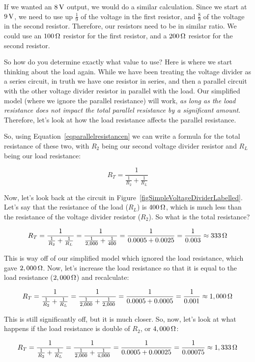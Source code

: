 If we wanted an $8\,\si{\volt}$ output, we would do a similar calculation.  
Since we start at $9\,\si{\volt}$, we need to use up $\frac{1}{9}$ of the voltage in the first resistor, and $\frac{8}{9}$ of the voltage in the second resistor.
Therefore, our resistors need to be in similar ratio.
We could use an $100\,\si{\ohm}$ resistor for the first resistor, and a $200\,\si{\ohm}$ resistor for the second resistor.

So how do you determine exactly what value to use?
Here is where we start thinking about the load again.
While we have been treating the voltage divider as a series circuit, in truth we have one resistor in series, and then a parallel circuit with the other voltage divider resistor in parallel with the load.
Our simplified model (where we ignore the parallel resistance) will work, \emph{as long as the load resistance does not impact the total parallel resistance by a significant amount}.
Therefore, let's look at how the load resistance affects the parallel resistance.

So, using Equation~\ref{eqparallelresistancen} we can write a formula for the total resistance of these two, with $R_2$ being our second voltage divider resistor and $R_L$ being our load resistance:

$$ R_T = \frac{1}{\frac{1}{R_2} + \frac{1}{R_L}} $$

Now, let's look back at the circuit in Figure~\ref{figSimpleVoltageDividerLabelled}.
Let's say that the resistance of the load ($R_L$) is $400\,\si{\ohm}$, which is much less than the resistance of the voltage divider resistor ($R_2$).
So what is the total resistance?

$$ R_T = \frac{1}{\frac{1}{R_2} + \frac{1}{R_L}} = \frac{1}{\frac{1}{2,000} + \frac{1}{400}} = \frac{1}{0.0005 + 0.0025} = \frac{1}{0.003} \approx 333\,\si{\ohm} $$

This is way off of our simplified model which ignored the load resistance, which gave $2,000\,\si{\ohm}$.
Now, let's increase the load resistance so that it is equal to the load resistance ($2,000\,\si{\ohm}$) and recalculate:

$$ R_T = \frac{1}{\frac{1}{R_2} + \frac{1}{R_L}} = \frac{1}{\frac{1}{2,000} + \frac{1}{2,000}} = \frac{1}{0.0005 + 0.0005} = \frac{1}{0.001} \approx 1,000\,\si{\ohm} $$

This is still significantly off, but it is much closer.
So, now, let's look at what happens if the load resistance is double of $R_2$, or $4,000\,\si{\ohm}$:

$$ R_T = \frac{1}{\frac{1}{R_2} + \frac{1}{R_L}} = \frac{1}{\frac{1}{2,000} + \frac{1}{4,000}} = \frac{1}{0.0005 + 0.00025} = \frac{1}{0.00075} \approx 1,333\,\si{\ohm} $$

